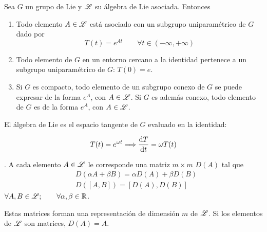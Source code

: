 \begin{proposicion} Sea $G$ un grupo de Lie y $\mathscr{L}$ su álgebra de Lie asociada. Entonces
\begin{enumerate}[label=\roman*)] 
\item Todo elemento $A\in \mathscr{L}$ está asociado con un subgrupo uniparamétrico de $G$ dado por
\begin{equation}
T(t)=e^{At}\qquad \forall t\in(-\infty,+\infty)
\end{equation}
\item Todo elemento de $G$ en un entorno cercano a la identidad pertenece a un subgrupo uniparamétrico de $G$: $T(0)=e$.
\item Si $G$ es compacto, todo elemento de un subgrupo conexo de $G$ se puede expresar de la forma $e^A$, con $A\in\mathscr{L}$. Si $G$ es además conexo, todo elemento de $G$ es de la forma $e^A$, con $A\in\mathscr{L}$.
\end{enumerate}
\end{proposicion}

\begin{nota}
El álgebra de Lie es el espacio tangente de $G$ evaluado en la identidad:

\begin{equation}
T(t)=e^{\omega t}\Longrightarrow \frac{\mathrm{d}T}{\mathrm{d}t}=\omega T(t)
\end{equation}
\end{nota}

\begin{definicion}. A cada elemento $A\in\mathscr{L}$ le corresponde una matriz $m\times m$ $D(A)$ tal que
\begin{subequations}
\begin{flalign}
&D(\alpha A+\beta B)=\alpha D(A)+\beta D(B)\\
& D([A,B])=\left[D(A),D(B)\right]
\end{flalign}
\end{subequations}
$\forall A,B\in\mathscr{L};\qquad \forall\alpha,\beta\in\mathbb{R}$. \medskip

Estas matrices forman una representación de dimensión $m$ de $\mathscr{L}$. Si los elementos de $\mathscr{L}$ son matrices, $D(A)=A$.
\end{definicion}

